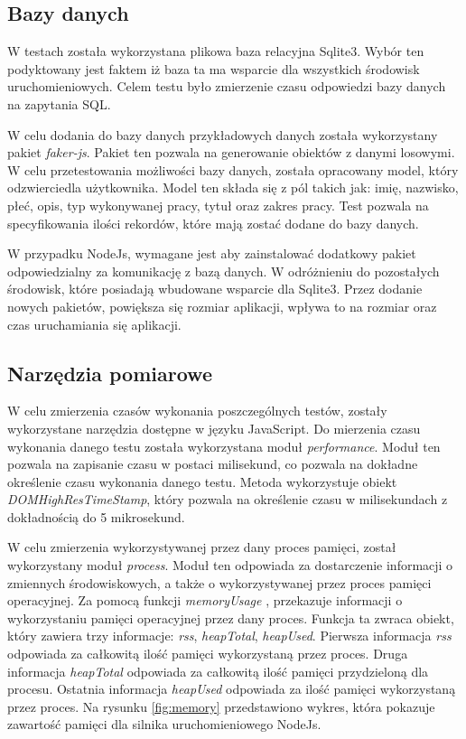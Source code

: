\subsection{Bazy danych}
W testach została wykorzystana plikowa baza relacyjna Sqlite3. Wybór ten podyktowany jest faktem iż baza ta ma wsparcie dla wszystkich środowisk uruchomieniowych. Celem testu było zmierzenie czasu odpowiedzi bazy danych na zapytania SQL. 

W celu dodania do bazy danych przykładowych danych została wykorzystany pakiet \textit{faker-js}. Pakiet ten pozwala na generowanie obiektów z danymi losowymi. W celu przetestowania możliwości bazy danych, została opracowany model, który odzwierciedla użytkownika. Model ten składa się z pól takich jak: imię, nazwisko, płeć, opis, typ wykonywanej pracy, tytuł oraz zakres pracy. Test pozwala na specyfikowania ilości rekordów, które mają zostać dodane do bazy danych.

W przypadku NodeJs, wymagane jest aby zainstalować dodatkowy pakiet odpowiedzialny za komunikację z bazą danych. W odróżnieniu do pozostałych środowisk, które posiadają wbudowane wsparcie dla Sqlite3. Przez dodanie nowych pakietów, powiększa się rozmiar aplikacji, wpływa to na rozmiar oraz czas uruchamiania się aplikacji.

\subsection{Narzędzia pomiarowe}
W celu zmierzenia czasów wykonania poszczególnych testów, zostały wykorzystane narzędzia dostępne w języku JavaScript. Do mierzenia czasu wykonania danego testu została wykorzystana moduł \textit{performance}. Moduł ten pozwala na zapisanie czasu w postaci milisekund, co pozwala na dokładne określenie czasu wykonania danego testu. Metoda wykorzystuje obiekt \textit{DOMHighResTimeStamp}, który pozwala na określenie czasu w milisekundach z dokładnością do 5 mikrosekund.

W celu zmierzenia wykorzystywanej przez dany proces pamięci, został wykorzystany moduł \textit{process}. Moduł ten odpowiada za dostarczenie informacji o zmiennych środowiskowych, a także o wykorzystywanej przez proces pamięci operacyjnej. Za pomocą funkcji \textit{memoryUsage} \cite{memoryUsage} \cite{memoryUsageImage}, przekazuje informacji o wykorzystaniu pamięci operacyjnej przez dany proces. Funkcja ta zwraca obiekt, który zawiera trzy informacje: \textit{rss}, \textit{heapTotal}, \textit{heapUsed}. Pierwsza informacja \textit{rss} odpowiada za całkowitą ilość pamięci wykorzystaną przez proces. Druga informacja \textit{heapTotal} odpowiada za całkowitą ilość pamięci przydzieloną dla procesu. Ostatnia informacja \textit{heapUsed} odpowiada za ilość pamięci wykorzystaną przez proces. Na rysunku \ref{fig:memory} przedstawiono wykres, która pokazuje zawartość pamięci dla silnika uruchomieniowego NodeJs. 

